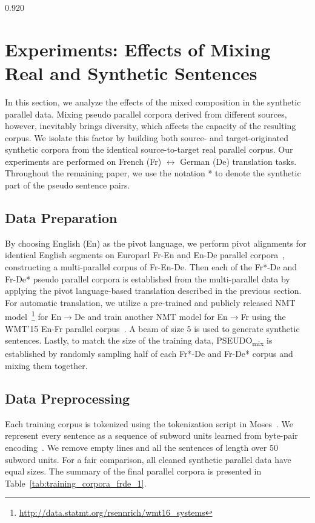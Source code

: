 \documentclass[11pt,letterpaper]{article}
\newcommand{\mylinespacing}{0.920}
\begin{document}
\begin{spacing}{\mylinespacing}
\section{Experiments: Effects of Mixing Real and Synthetic Sentences}
In this section, we analyze the effects of the mixed composition in the synthetic parallel data. Mixing pseudo parallel corpora derived from different sources, however, inevitably brings diversity, which affects the capacity of the resulting corpus. We isolate this factor by building both source- and target-originated synthetic corpora from the identical source-to-target real parallel corpus. Our experiments are performed on French (Fr) \(\leftrightarrow\) German (De) translation tasks. Throughout the remaining paper, we use the notation * to denote the synthetic part of the pseudo sentence pairs.

\subsection{Data Preparation}
By choosing English (En) as the pivot language, we perform pivot alignments for identical English segments on Europarl Fr-En and En-De parallel corpora~\cite{koehn2005europarl}, constructing a multi-parallel corpus of Fr-En-De. Then each of the Fr*-De and Fr-De* pseudo parallel corpora is established from the multi-parallel data by applying the pivot language-based translation described in the previous section. For automatic translation, we utilize a pre-trained and publicly released NMT model~\footnote{ \url{http://data.statmt.org/rsennrich/wmt16_systems}} for En\(\rightarrow\)De and train another NMT model for En\(\rightarrow\)Fr using the WMT'15 En-Fr parallel corpus~\cite{bojar-EtAl:2015:WMT}. A beam of size 5 is used to generate synthetic sentences. Lastly, to match the size of the training data, PSEUDO\textsubscript{mix} is established by randomly sampling half of each Fr*-De and Fr-De* corpus and mixing them together.

\subsection{Data Preprocessing}
Each training corpus is tokenized using the tokenization script in Moses~\cite{koehn2007moses}. We represent every sentence as a sequence of subword units learned from byte-pair encoding~\cite{sennrich2015neural}. We remove empty lines and all the sentences of length over 50 subword units. For a fair comparison, all cleaned synthetic parallel data have equal sizes. The summary of the final parallel corpora is presented in Table~\ref{tab:training_corpora_frde_1}.


\end{spacing}
\end{document}
